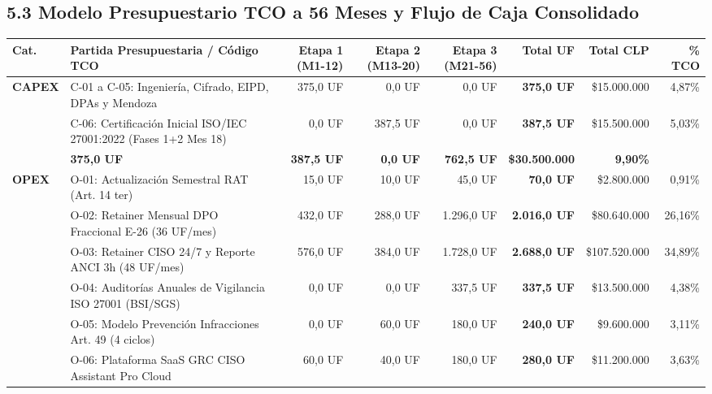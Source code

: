 \documentclass[7.5pt,letterpaper]{article}
\begin{document}
\clearpage

\subsection*{\scriptsize\color{NavyPrimary}5.3 Modelo Presupuestario TCO a 56 Meses y Flujo de Caja Consolidado}
\vspace{-4.5pt}
\fontsize{5.4pt}{6.4pt}\selectfont
\begin{tabularx}{\textwidth}{@{} l >{\raggedright\arraybackslash}X r r r r r r @{}}
\toprule
\rowcolor{TableHeadBg}
\textbf{Cat.} & \textbf{Partida Presupuestaria / Código TCO} & \textbf{Etapa 1 (M1-12)} & \textbf{Etapa 2 (M13-20)} & \textbf{Etapa 3 (M21-56)} & \textbf{Total UF} & \textbf{Total CLP} & \textbf{\% TCO} \\
\midrule
\textbf{CAPEX} & C-01 a C-05: Ingeniería, Cifrado, EIPD, DPAs y Mendoza & 375,0 UF & 0,0 UF & 0,0 UF & \textbf{375,0 UF} & \$15.000.000 & 4,87\% \\
\rowcolor{RowAltBg}
& C-06: Certificación Inicial ISO/IEC 27001:2022 (Fases 1+2 Mes 18) & 0,0 UF & 387,5 UF & 0,0 UF & \textbf{387,5 UF} & \$15.500.000 & 5,03\% \\
\rowcolor{TableHeadBg}
\multicolumn{2}{@{}l}{\textbf{SUBTOTAL GASTOS DE CAPITAL (CAPEX)}} & \textbf{375,0 UF} & \textbf{387,5 UF} & \textbf{0,0 UF} & \textbf{762,5 UF} & \textbf{\$30.500.000} & \textbf{9,90\%} \\
\midrule
\textbf{OPEX} & O-01: Actualización Semestral RAT (Art. 14 ter) & 15,0 UF & 10,0 UF & 45,0 UF & \textbf{70,0 UF} & \$2.800.000 & 0,91\% \\
\rowcolor{RowAltBg}
& O-02: Retainer Mensual DPO Fraccional E-26 (36 UF/mes) & 432,0 UF & 288,0 UF & 1.296,0 UF & \textbf{2.016,0 UF} & \$80.640.000 & 26,16\% \\
& O-03: Retainer CISO 24/7 y Reporte ANCI 3h (48 UF/mes) & 576,0 UF & 384,0 UF & 1.728,0 UF & \textbf{2.688,0 UF} & \$107.520.000 & 34,89\% \\
\rowcolor{RowAltBg}
& O-04: Auditorías Anuales de Vigilancia ISO 27001 (BSI/SGS) & 0,0 UF & 0,0 UF & 337,5 UF & \textbf{337,5 UF} & \$13.500.000 & 4,38\% \\
& O-05: Modelo Prevención Infracciones Art. 49 (4 ciclos) & 0,0 UF & 60,0 UF & 180,0 UF & \textbf{240,0 UF} & \$9.600.000 & 3,11\% \\
\rowcolor{RowAltBg}
& O-06: Plataforma SaaS GRC CISO Assistant Pro Cloud & 60,0 UF & 40,0 UF & 180,0 UF & \textbf{280,0 UF} & \$11.200.000 & 3,63\% \\

\end{tabularx}
\end{document}
